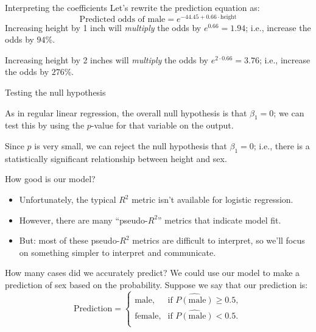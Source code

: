 \documentclass{beamer}\usepackage[]{graphicx}\usepackage[]{color}
\begin{document}
\begin{darkframes}
    \begin{frame}{Interpreting the coefficients}
      Let's rewrite the prediction equation as:
      \[
        \text{Predicted odds of male} = e^{-44.45 + 0.66\cdot\text{height}}
      \]
      Increasing height by 1 inch will \emph{multiply} the odds by $e^{0.66}=1.94$; i.e., increase the odds by $94$\%.

      \bigskip\pause
      Increasing height by 2 inches will \emph{multiply} the odds by $e^{2 \cdot 0.66}=3.76$; i.e., increase the odds by $276$\%.
    \end{frame}

    \begin{frame}{Testing the null hypothesis}
      \begin{center}
        As in regular linear regression, the overall null hypothesis is that $\beta_1=0$; we can test this by using the $p$-value for that variable on the output.

        \bigskip\pause
        Since $p$ is very small, we can reject the null hypothesis that $\beta_1=0$; i.e., there is a statistically significant relationship between height and sex.
      \end{center}
    \end{frame}

    \begin{frame}{How good is our model?}
      \begin{itemize}[<+->]
        \item Unfortunately, the typical $R^2$ metric isn't available for logistic regression.
        \item However, there are many ``pseudo-$R^2$'' metrics that indicate model fit.
        \item But: most of these pseudo-$R^2$ metrics are difficult to interpret, so we'll focus on something simpler to interpret and communicate.
      \end{itemize}
    \end{frame}

    \begin{frame}[fragile]{How many cases did we accurately predict?}
      We could use our model to make a prediction of sex based on the probability. Suppose we say that our prediction is:
      \[
        \text{Prediction} = \begin{cases}
          \text{male}, & \text{if $\widehat{P(\text{male})} \geq 0.5$}, \\
          \text{female}, & \text{if $\widehat{P(\text{male})} < 0.5$}. \\
        \end{cases}
      \]


\end{frame}
\end{darkframes}
\end{document}
